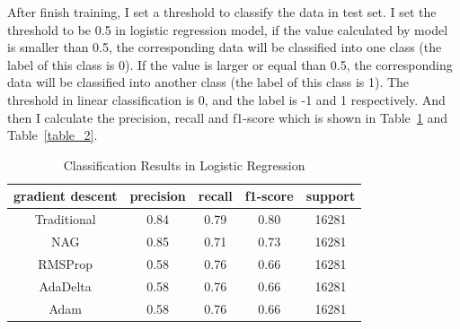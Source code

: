 \documentclass[journal, a4paper]{IEEEtran}
\begin{document}
After finish training, I set a threshold to classify the data in test set. I set the threshold to be 0.5 in logistic regression model, if the value calculated by model is smaller than 0.5, the corresponding data will be classified into one class (the label of this class is 0). If the value is larger or equal than 0.5, the corresponding data will be classified into another class (the label of this class is 1). The threshold in linear classification is 0, and the label is -1 and 1 respectively. And then I calculate the precision, recall and f1-score which is shown in Table~\ref{table_1} and Table~\ref{table_2}.

    \begin{table}[!hbt]
		\begin{center}
		\caption{Classification Results in Logistic Regression}
		\label{table_1}
		\begin{tabular}{|c|c|c|c|c|}
			\hline
			gradient descent  & precision & recall & f1-score & support \\
			\hline
			Traditional & 0.84 & 0.79 & 0.80  & 16281 \\
			\hline
			NAG & 0.85 & 0.71 & 0.73  & 16281 \\
			\hline
			RMSProp & 0.58 & 0.76 & 0.66 & 16281 \\
			\hline
            AdaDelta & 0.58 & 0.76 & 0.66 & 16281 \\
			\hline
            Adam & 0.58 & 0.76 & 0.66 & 16281 \\
			\hline
		\end{tabular}
		\end{center}
	\end{table}
\end{document}
